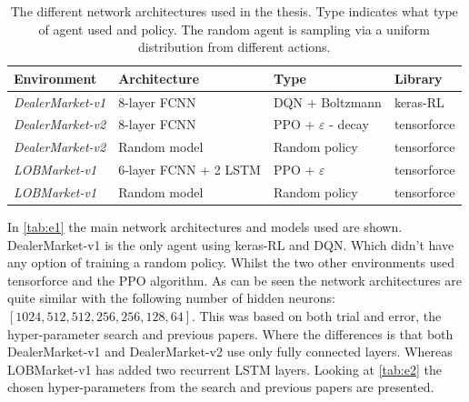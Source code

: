 \documentclass{kththesis}
\theoremstyle{definition}
\begin{document}
\begin{table}[H]
\centering
\caption{The different network architectures used in the thesis. Type indicates what type of agent used and policy. The random agent is sampling via a uniform distribution from different actions.}
\label{tab:e1}
\begin{tabular}{llll}
 \textbf{Environment} & \textbf{Architecture}  & \textbf{Type}  & \textbf{Library}  \\ \hline
 \textit{DealerMarket-v1}& 8-layer FCNN  & DQN + Boltzmann  & keras-RL   \\
 \textit{DealerMarket-v2}& 8-layer FCNN  & PPO + $\varepsilon$ - decay  & tensorforce  \\
 \textit{DealerMarket-v2} & Random model  & Random policy  & tensorforce \\
 \textit{LOBMarket-v1} & 6-layer FCNN + 2 LSTM  & PPO + $\varepsilon$  & tensorforce \\ 
 \textit{LOBMarket-v1} & Random model  & Random policy  & tensorforce
\end{tabular}
\end{table}
In \autoref{tab:e1} the main network architectures and models used are shown. DealerMarket-v1 is the only agent using keras-RL and DQN. Which didn't have any option of training a random policy. Whilst the two other environments used tensorforce and the PPO algorithm. As can be seen the network architectures are quite similar with the following number of hidden neurons: $[1024, 512,512,256,256,128,64]$. This was based on both trial and error, the hyper-parameter search and previous papers. 
\newline
\newline
Where the differences is that both DealerMarket-v1 and DealerMarket-v2 use only fully connected layers. Whereas LOBMarket-v1 has added two recurrent LSTM layers. Looking at \autoref{tab:e2} the chosen hyper-parameters from the search and previous papers are presented.
\end{document}
